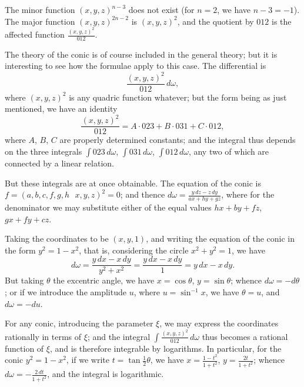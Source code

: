 \documentclass[11pt,a4paper]{book}
\begin{document}
\begin{art}\label{art:91}
The minor function $(x, y, z)^{n-3}$ does not exist (for $n = 2$, we have $n - 3 = -1$). The major function $(x, y, z)^{2n-2}$ is $(x, y, z)^2$, and the quotient by $012$ is the affected function $\frac{(x, y, z)^2}{012}$.

The theory of the conic is of course included in the general theory; but it is interesting to see how the formulae apply to this case. The differential is
\[
\frac{(x, y, z)^2}{012}\,d\omega,
\]
where $(x, y, z)^2$ is any quadric function whatever; but the form being as just mentioned, we have an identity
\[
\frac{(x, y, z)^2}{012} = A \cdot 023 + B \cdot 031 + C \cdot 012,
\]
where $A$, $B$, $C$ are properly determined constants; and the integral thus depends on the three integrals $\int 023\,d\omega$, $\int 031\,d\omega$, $\int 012\,d\omega$, any two of which are connected by a linear relation.
\end{art}

\newpage
\begin{art}\label{art:92}
But these integrals are at once obtainable. The equation of the conic is $f = (a, b, c, f, g, h \,\,\,\, x, y, z)^2 = 0$; and thence $d\omega = \frac{y\,dz - z\,dy}{ax + hy + gz}$, where for the denominator we may substitute either of the equal values $hx + by + fz$, $gx + fy + cz$.

Taking the coordinates to be $(x, y, 1)$, and writing the equation of the conic in the form $y^2 = 1 - x^2$, that is, considering the circle $x^2 + y^2 = 1$, we have
\[
d\omega = \frac{y\,dx - x\,dy}{y^2 + x^2} = \frac{y\,dx - x\,dy}{1} = y\,dx - x\,dy.
\]
But taking $\theta$ the excentric angle, we have $x = \cos\theta$, $y = \sin\theta$; whence $d\omega = -d\theta$; or if we introduce the amplitude $u$, where $u = \sin^{-1}x$, we have $\theta = u$, and $d\omega = -du$.
\end{art}

\begin{art}\label{art:93}
For any conic, introducing the parameter $\xi$, we may express the coordinates rationally in terms of $\xi$; and the integral $\int \frac{(x, y, z)^2}{012}\,d\omega$ thus becomes a rational function of $\xi$, and is therefore integrable by logarithms. In particular, for the conic $y^2 = 1 - x^2$, if we write $t = \tan\frac{1}{2}\theta$, we have $x = \frac{1 - t^2}{1 + t^2}$, $y = \frac{2t}{1 + t^2}$; whence $d\omega = -\frac{2\,dt}{1 + t^2}$, and the integral is logarithmic.
\end{art}
\end{document}
